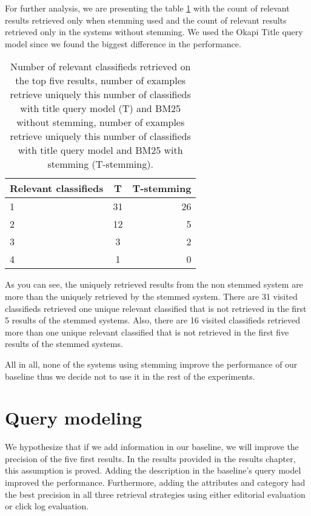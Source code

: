 For further analysis, we are presenting the table \ref{table:stemmRelIrrel} with the count of relevant results retrieved only when stemming used and the count of relevant results retrieved only in the systems without stemming. We used the Okapi Title query model since we found the biggest difference in the performance.

\begin{table}[H]
\begin{center}
\caption{Number of relevant classifieds retrieved on the top five results, number of examples retrieve uniquely this number of classifieds with title query model (T) and BM25 without stemming, number of examples retrieve uniquely this number of classifieds with title query model and BM25 with stemming (T-stemming).}
\label{table:stemmRelIrrel}
\begin{tabular}{lcr}
\midrule
Relevant classifieds & T & T-stemming \\
\midrule
	1 & 31 & 26 \\
	2 & 12 & 5  \\
	3 & 3 & 2 \\
	4 & 1 & 0  \\
\bottomrule
\end{tabular}
\end{center}
\end{table}


As you can see, the uniquely retrieved results from the non stemmed system are more than the uniquely retrieved by the stemmed system. There are 31 visited classifieds retrieved one unique relevant classified that is not retrieved in the first 5 results of the stemmed systems. Also, there are 16 visited classifieds retrieved more than one unique relevant classified that is not retrieved in the first five results of the stemmed systems.

All in all, none of the systems using stemming improve the performance of our baseline thus we decide not to use it in the rest of the experiments.

\section{Query modeling}

We hypothesize that if we add information in our baseline, we will improve the precision of the five first results. In the results provided in the results chapter, this assumption is proved. Adding the description in the baseline's query model improved the performance. Furthermore, adding the attributes and category had the best precision in all three retrieval strategies using either editorial evaluation or click log evaluation.

